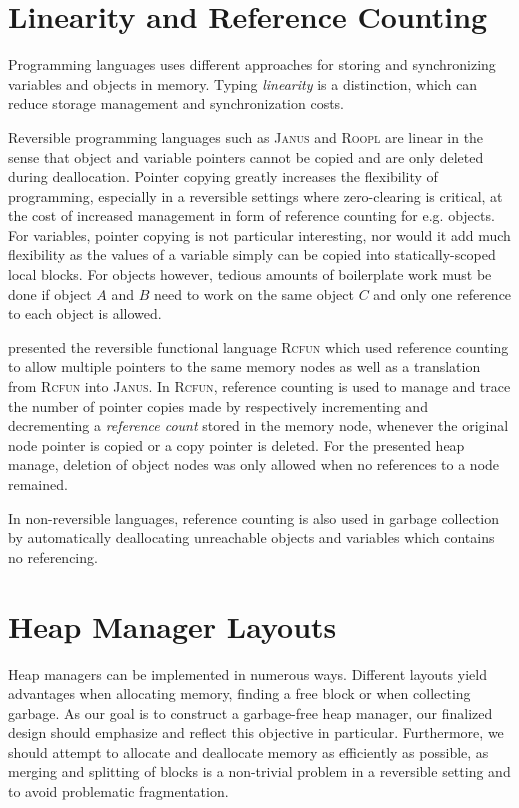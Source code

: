 \section{Linearity and Reference Counting}
\label{sec:referencing}
Programming languages uses different approaches for storing and synchronizing variables and objects in memory. Typing \textit{linearity} is a distinction, which can reduce storage management and synchronization costs. %

Reversible programming languages such as \textsc{Janus} and \textsc{Roopl} are linear in the sense that object and variable pointers cannot be copied and are only deleted during deallocation. Pointer copying greatly increases the flexibility of programming, especially in a reversible settings where zero-clearing is critical, at the cost of increased management in form of reference counting for e.g. objects. For variables, pointer copying is not particular interesting, nor would it add much flexibility as the values of a variable simply can be copied into statically-scoped local blocks. For objects however, tedious amounts of boilerplate work must be done if object $A$ and $B$ need to work on the same object $C$ and only one reference to each object is allowed.

 \citeauthor{tm:refcounting} presented the reversible functional language \textsc{Rcfun} which used reference counting to allow multiple pointers to the same memory nodes as well as a translation from \textsc{Rcfun} into \textsc{Janus}. In \textsc{Rcfun}, reference counting is used to manage and trace the number of pointer copies made by respectively incrementing and decrementing a \textit{reference count} stored in the memory node, whenever the original node pointer is copied or a copy pointer is deleted. For the presented heap manage, deletion of object nodes was only allowed when no references to a node remained.

In non-reversible languages, reference counting is also used in garbage collection by automatically deallocating unreachable objects and variables which contains no referencing. 


\section{Heap Manager Layouts}
\label{sec:heap-manager-layout}
Heap managers can be implemented in numerous ways. Different layouts yield advantages when allocating memory, finding a free block or when collecting garbage. As our goal is to construct a garbage-free heap manager, our finalized design should emphasize and reflect this objective in particular. Furthermore, we should attempt to allocate and deallocate memory as efficiently as possible, as merging and splitting of blocks is a non-trivial problem in a reversible setting and to avoid problematic fragmentation.

